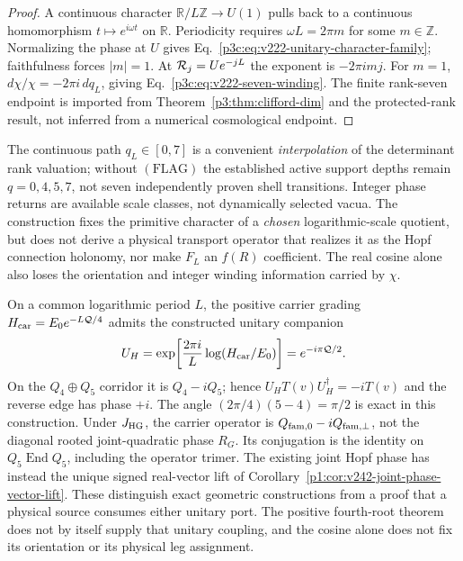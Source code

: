 \documentclass[12pt,a4paper]{article}
\begin{document}
\begin{proof}
A continuous character $\mathbb R/L\mathbb Z\to U(1)$ pulls back to
a continuous homomorphism $t\mapsto e^{i\omega t}$ on $\mathbb R$.
Periodicity requires $\omega L=2\pi m$ for some $m\in\mathbb Z$.
Normalizing the phase at $U$ gives
Eq.~\eqref{p3c:eq:v222-unitary-character-family}; faithfulness forces
$|m|=1$.  At $\mathcal R_j=Ue^{-jL}$ the exponent is $-2\pi i mj$.
For $m=1$, $d\chi/\chi=-2\pi i\,dq_L$, giving
Eq.~\eqref{p3c:eq:v222-seven-winding}.
The finite rank-seven endpoint is imported from
Theorem~\ref{p3:thm:clifford-dim} and the protected-rank result,
not inferred from a numerical cosmological endpoint.
\end{proof}

\begin{remark}
\label{p3c:rem:v222-phase-scope}
The continuous path $q_L\in[0,7]$ is a convenient \emph{interpolation}
of the determinant rank valuation; without $(\mathrm{FLAG})$ the
established active support depths remain $q=0,4,5,7$, not seven
independently proven shell transitions.  Integer phase returns are
available scale classes, not dynamically selected vacua.  The
construction fixes the primitive character of a \emph{chosen}
logarithmic-scale quotient, but does not derive a physical transport
operator that realizes it as the Hopf connection holonomy, nor make
$F_L$ an $f(R)$ coefficient.  The real cosine alone also loses the
orientation and integer winding information carried by $\chi$.
\end{remark}

\begin{remark}
\label{p3c:rem:v242-quarter-character-owner}
On a common logarithmic period \(L\), the positive carrier grading
\(H_{\rm car}=E_0e^{-L\mathcal Q/4}\) admits the constructed unitary
companion
\[
 U_H=\exp\!\left[\frac{2\pi i}{L}\log(H_{\rm car}/E_0)\right]
       =e^{-i\pi\mathcal Q/2}.
\]
On the \(Q_4\oplus Q_5\) corridor it is \(Q_4-iQ_5\); hence
\(U_HT(v)U_H^\dagger=-iT(v)\) and the reverse edge has phase \(+i\).
The angle \((2\pi/4)(5-4)=\pi/2\) is exact in this construction.
Under \(J_{\rm HG}\), the carrier operator is
\(Q_{\rm fam,0}-iQ_{\rm fam,\perp}\), not the diagonal rooted
joint-quadratic phase \(R_G\). Its conjugation is the identity on
\(Q_5\operatorname{End}Q_5\), including the operator trimer.
The existing joint Hopf phase has instead the unique signed real-vector
lift of Corollary~\ref{p1:cor:v242-joint-phase-vector-lift}.
These distinguish exact geometric constructions from a proof that a
physical source consumes either unitary port. The positive fourth-root
theorem does not by itself supply that unitary coupling, and the cosine
alone does not fix its orientation or its physical leg assignment.
\end{remark}
\end{document}
